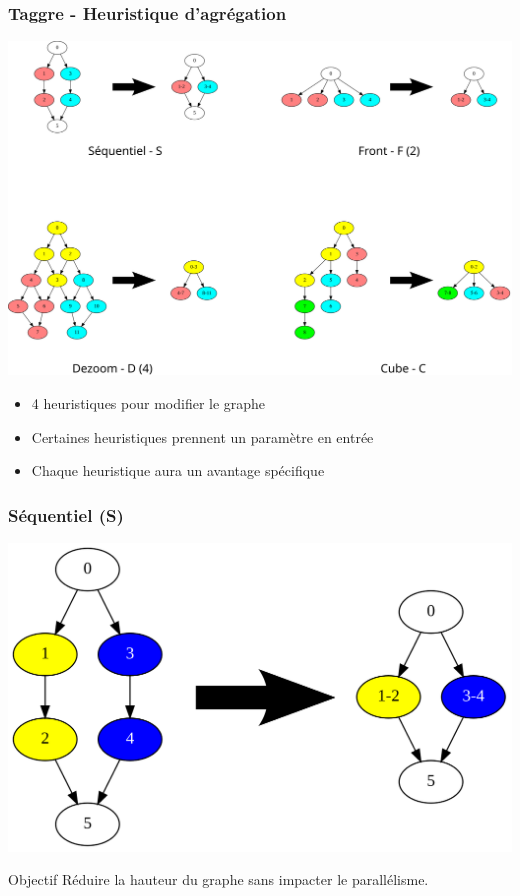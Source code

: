 \documentclass{beamer}
\begin{document}
\begin{frame}
  \frametitle{Taggre - Heuristique d'agrégation}

  \centerline{\includegraphics[width=0.80\linewidth]{all_algo}}

  \begin{itemize}
    \item 4 heuristiques pour modifier le graphe
    \item Certaines heuristiques prennent un paramètre en entrée
    \item Chaque heuristique aura un avantage spécifique
  \end{itemize}
\end{frame}



\begin{frame}
  \frametitle{Séquentiel (S)}

  \centerline{\includegraphics[width=0.80\linewidth]{algo_S}}

  \begin{block}{Objectif}
    Réduire la hauteur du graphe sans impacter le parallélisme.
  \end{block}
\end{frame}
\end{document}
